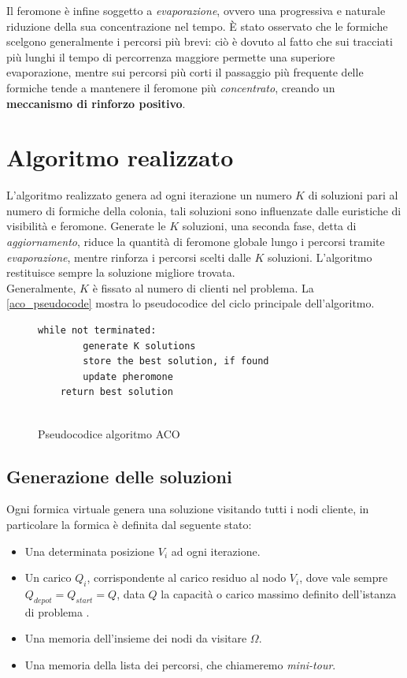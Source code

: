 \documentclass[11pt,a4paper]{article}
\begin{document}
\vspace{.3cm}
\noindent
Il feromone è infine soggetto a \textit{evaporazione}, ovvero una progressiva e naturale riduzione della sua concentrazione nel tempo. È stato osservato che le formiche scelgono generalmente i percorsi più brevi: ciò è dovuto al fatto che sui tracciati più lunghi il tempo di percorrenza maggiore permette una superiore evaporazione, mentre sui percorsi più corti il passaggio più frequente delle formiche tende a mantenere il feromone più \textit{concentrato}, creando un \textbf{meccanismo di rinforzo positivo}.

\section{Algoritmo realizzato}

L'algoritmo realizzato genera ad ogni iterazione un numero \(K\) di soluzioni pari al numero di formiche della colonia, tali soluzioni sono influenzate dalle euristiche di visibilità e feromone. Generate le \(K\) soluzioni, una seconda fase, detta di \textit{aggiornamento}, riduce la quantità di feromone globale lungo i percorsi tramite \textit{evaporazione}, mentre rinforza i percorsi scelti dalle \(K\) soluzioni. L'algoritmo restituisce sempre la soluzione migliore trovata. 
\\Generalmente, \(K\) è fissato al numero di clienti nel problema. La \autoref{aco_pseudocode} mostra lo pseudocodice del ciclo principale dell'algoritmo.


\begin{figure}[H]
  \caption{Pseudocodice algoritmo ACO}
  \label{aco_pseudocode}
\begin{lstlisting}[gobble=2]
    while not terminated:
        generate K solutions
        store the best solution, if found
        update pheromone
    return best solution
        
\end{lstlisting}
\end{figure}
\noindent


\vspace{.3cm}
\subsection{Generazione delle soluzioni}
Ogni formica virtuale genera una soluzione visitando tutti i nodi cliente, in particolare la formica è definita dal seguente stato:
\begin{itemize}
    \item Una determinata posizione \(V_i\) ad ogni iterazione.
    \item Un carico \(Q_i\), corrispondente al carico residuo al nodo \(V_i\), dove vale sempre \(Q_{depot} = Q_{start} = Q\), data \(Q\) la capacità o carico massimo definito dell'istanza di problema .
    \item Una memoria dell'insieme dei nodi da visitare $\Omega$.
    \item Una memoria della lista dei percorsi, che chiameremo \textit{mini-tour}.
\end{itemize}
\end{document}
